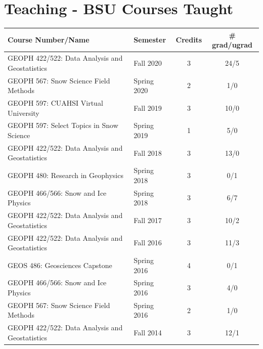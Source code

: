 \documentclass[11pt]{article}
\renewcommand\arraystretch{1}
\begin{document}
\pagebreak


\begin{table}[!htbp]
\section*{Teaching - BSU Courses Taught}
\renewcommand\arraystretch{0.7}
  \centering
  \begin{tabular}{|l|l|c|c|}
\hline
\textbf{Course Number/Name} & \textbf{Semester} & \textbf{Credits} & \textbf{\# grad/ugrad} \\ \hline \hline

GEOPH 422/522: Data Analysis and Geostatistics & Fall 2020 & 3 & 24/5 \\ \hline
GEOPH 567: Snow Science Field Methods & Spring 2020 & 2 & 1/0 \\ \hline
GEOPH 597: CUAHSI Virtual University & Fall 2019 & 3 & 10/0 \\ \hline
GEOPH 597: Select Topics in Snow Science & Spring 2019 & 1 & 5/0 \\ \hline
GEOPH 422/522: Data Analysis and Geostatistics & Fall 2018 & 3 & 13/0 \\ \hline
GEOPH 480: Research in Geophysics & Spring 2018 & 3 & 0/1 \\ \hline
GEOPH 466/566: Snow and Ice Physics & Spring 2018 & 3 & 6/7 \\ \hline
GEOPH 422/522: Data Analysis and Geostatistics & Fall 2017 & 3 & 10/2 \\ \hline
GEOPH 422/522: Data Analysis and Geostatistics & Fall 2016 & 3 & 11/3 \\ \hline
GEOS 486: Geosciences Capstone & Spring 2016 & 4 & 0/1 \\ \hline
GEOPH 466/566: Snow and Ice Physics & Spring 2016 & 3 & 4/0 \\ \hline
GEOPH 567: Snow Science Field Methods & Spring 2016 & 2 & 1/0 \\ \hline
GEOPH 422/522: Data Analysis and Geostatistics & Fall 2014 & 3 & 12/1 \\ \hline

\end{tabular}
\end{table}
\end{document}
